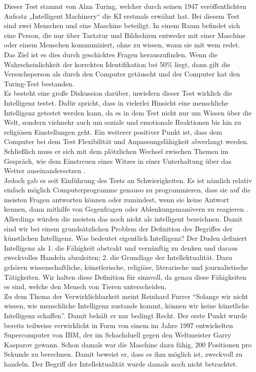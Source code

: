 Dieser Test stammt von Alan Turing, welcher durch seinen 1947 veröffentlichten Aufsatz „Intelligent Machinery“ die KI erstmals erwähnt hat. Bei diesem Test sind zwei Menschen und eine Maschine beteiligt. In einem Raum befindet sich eine Person, die nur über Tastatur und Bildschirm entweder mit einer Maschine oder einem Menschen kommuniziert, ohne zu wissen, wann sie mit wem redet. Das Ziel ist es dies durch geschicktes Fragen herauszufinden. Wenn die Wahrscheinlichkeit der korrekten Identifikation bei 50\% liegt, dann gilt die Versuchsperson als durch den Computer getäuscht und der Computer hat den Turing-Test bestanden.  \\
%

Es besteht eine große Diskussion darüber, inwiefern dieser Test wirklich die Intelligenz testet. Dafür spricht, dass in vielerlei Hinsicht eine menschliche Intelligenz getestet werden kann, da es in dem Test nicht nur um Wissen über die Welt, sondern vielmehr auch um soziale und emotionale Reaktionen bis hin zu religiösen Einstellungen geht. Ein weiterer positiver Punkt ist, dass dem Computer bei dem Test Flexibilität und Anpassungsfähigkeit abverlangt werden. Schließlich muss er sich mit dem plötzlichen Wechsel zwischen Themen im Gespräch, wie dem Einstreuen eines Witzes in einer Unterhaltung über das Wetter auseinandersetzen \cite{TheGuardian_1}. \\
%

Jedoch gab es seit Einführung des Tests an Schwierigkeiten. Es ist nämlich relativ einfach möglich Computerprogramme genauso zu programmieren, dass sie auf die meisten Fragen antworten können oder zumindest, wenn sie keine Antwort kennen,  dann mithilfe von Gegenfragen oder Ablenkungsmanövern zu reagieren \cite{NewAtlantis}.  Allerdings würden die meisten das noch nicht als intelligent bezeichnen.
Damit sind wir bei einem grundsätzlichen Problem der Definition des Begriffes der künstlichen Intelligenz. Was bedeutet eigentlich Intelligenz? 
Der Duden definiert Intelligenz als
1. die Fähigkeit abstrakt und vernünftig zu denken und daraus zweckvolles Handeln abzuleiten;
2. die Grundlage der Intellektualität. Dazu gehören wissenschaftliche, künstlerische, religiöse, literarische und journalistische Tätigkeiten. 
Wir halten diese Definition für sinnvoll, da genau diese Fähigkeiten es sind, welche den Mensch von Tieren unterscheiden.\\
%

Zu dem Thema der Verwirklichbarkeit meint Reinhard Furrer  \enquote{Solange wir nicht wissen, wie menschliche Intelligenz zustande kommt, können wir keine künstliche Intelligenz schaffen}. Damit behält er nur bedingt Recht. Der erste Punkt wurde bereits teilweise verwirklicht in Form von einem im Jahre 1997 entwickelten Supercomputer von IBM, der im Schachduell gegen den Weltmeister Garry Kasparov gewann. Schon damals war die Maschine dazu fähig, 200 Positionen pro Sekunde zu berechnen. Damit beweist er, dass es ihm möglich ist, zweckvoll zu handeln. Der Begriff der Intellektualität wurde damals noch nicht betrachtet. \\
%

